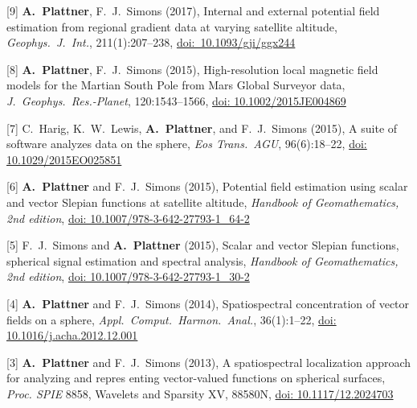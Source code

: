 \documentclass[10pt]{article}
\begin{document}
\spcp
\hspace{-0.5cm}[9] \textbf{A.~Plattner}, F.~J.~Simons (2017),
Internal and external potential field estimation
from regional gradient data at varying satellite altitude,
\emph{Geophys.~J.~Int.}, 211(1):207--238, \href{https://academic.oup.com/gji/article-lookup/doi/10.1093/gji/ggx244}{doi:~10.1093/gji/ggx244} 

\spcp
\hspace{-0.5cm}[8] \textbf{A.~Plattner}, F.~J.~Simons (2015),
High-resolution local magnetic field models for the
Martian South Pole
from Mars Global Surveyor data,
\emph{J.~Geophys.~Res.-Planet}, 120:1543--1566,
\href{http://onlinelibrary.wiley.com/doi/10.1002/2015JE004869/abstract}{doi: 10.1002/2015JE004869}

\spcp
\hspace{-0.5cm}[7] C.~Harig, K.~W.~Lewis, \textbf{A.~Plattner}, and F.~J.~Simons (2015),
A suite of software analyzes data on the sphere,
\emph{Eos Trans.~AGU}, 96(6):18--22,
\href{https://eos.org/project-updates/a-suite-of-software-analyzes-data-on-the-sphere-2}{doi: 10.1029/2015EO025851}

\spcp
\hspace{-0.5cm}[6] \textbf{A.~Plattner} and F.~J.~Simons (2015),
Potential field estimation using scalar and vector Slepian functions at satellite altitude,
\emph{Handbook of Geomathematics, 2nd edition},
\href{https://link.springer.com/referenceworkentry/10.1007\%2F978-3-642-27793-1_64-2}{doi: 10.1007/978-3-642-27793-1\_64-2}

\spcp
\hspace{-0.5cm}[5] F.~J.~Simons and \textbf{A.~Plattner} (2015),
Scalar and vector Slepian functions, spherical signal estimation and spectral analysis,
\emph{Handbook of Geomathematics, 2nd edition},
\href{https://link.springer.com/referenceworkentry/10.1007\%2F978-3-642-27793-1_30-2}{doi: 10.1007/978-3-642-27793-1\_30-2}

\spcp
\hspace{-0.5cm}[4] \textbf{A.~Plattner} and F.~J.~Simons (2014),
Spatiospectral concentration of vector fields on a sphere,
\emph{Appl.~Comput.~Harmon.~Anal.}, 36(1):1--22, 
\href{http://www.sciencedirect.com/science/article/pii/S106352031300002X?via\%3Dihub}{doi: 10.1016/j.acha.2012.12.001}

\spcp
\hspace{-0.5cm}[3] \textbf{A.~Plattner} and F.~J.~Simons (2013), 
A spatiospectral localization approach for analyzing and repres enting vector-valued functions on spherical surfaces,
\emph{Proc. SPIE} 8858, Wavelets and Sparsity XV, 88580N,
\href{http://proceedings.spiedigitallibrary.org/proceeding.aspx?articleid=1745029}{doi: 10.1117/12.2024703}
\end{document}
